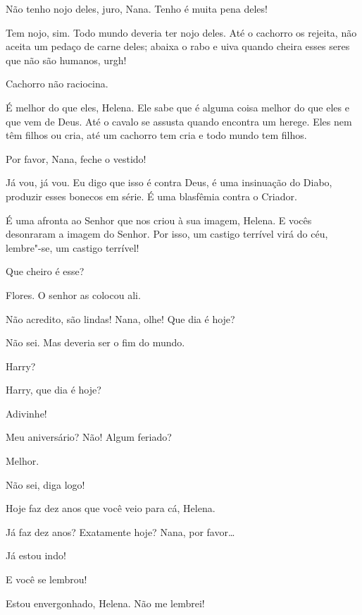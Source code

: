  Não tenho nojo deles, juro, Nana. Tenho é muita pena deles!

 Tem nojo, sim. Todo mundo deveria ter nojo deles. Até o cachorro os
rejeita, não aceita um pedaço de carne deles; abaixa o rabo e uiva quando
cheira esses seres que não são humanos, urgh!

 Cachorro não raciocina.

 É melhor do que eles, Helena. Ele sabe que é alguma coisa melhor do que
eles e que vem de Deus. Até o cavalo se assusta quando encontra um herege.
Eles nem têm filhos ou cria, até um cachorro tem cria e todo mundo tem filhos.

 Por favor, Nana, feche o vestido!

 Já vou, já vou. Eu digo que isso é contra Deus, é uma insinuação do Diabo,
produzir esses bonecos em série. É uma blasfêmia contra o Criador.

 É uma afronta ao Senhor que nos criou à sua imagem,
Helena. E vocês desonraram a imagem do Senhor. Por isso, um castigo terrível
virá do céu, lembre"-se, um castigo terrível!

 Que cheiro é esse?

 Flores. O senhor as colocou ali.

 Não acredito, são lindas! Nana, olhe! Que dia é hoje?

 Não sei. Mas deveria ser o fim do mundo.

 Harry?

 Harry, que dia é hoje?

 Adivinhe!

 Meu aniversário? Não! Algum feriado?

 Melhor.

 Não sei, diga logo!

 Hoje faz dez anos que você veio para cá, Helena.

 Já faz dez anos? Exatamente hoje? Nana, por favor\ldots{}

 Já estou indo! 

  E você se lembrou!

 Estou envergonhado, Helena. Não me lembrei!

